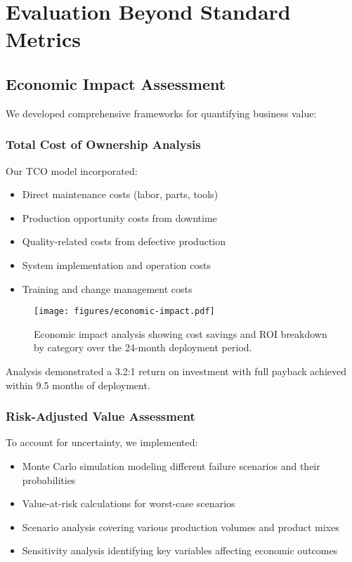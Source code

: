 \section{Evaluation Beyond Standard Metrics}
\subsection{Economic Impact Assessment}
We developed comprehensive frameworks for quantifying business value:

\subsubsection{Total Cost of Ownership Analysis}
Our TCO model incorporated:
\begin{itemize}
    \item Direct maintenance costs (labor, parts, tools)
    \item Production opportunity costs from downtime
    \item Quality-related costs from defective production
    \item System implementation and operation costs
    \item Training and change management costs
\end{itemize}

\begin{figure}[t]
\centering
\texttt{[image: figures/economic-impact.pdf]}
\caption{Economic impact analysis showing cost savings and ROI breakdown by category over the 24-month deployment period.}
\label{fig:economic_impact}
\end{figure}

Analysis demonstrated a 3.2:1 return on investment with full payback achieved within 9.5 months of deployment.

\subsubsection{Risk-Adjusted Value Assessment}
To account for uncertainty, we implemented:
\begin{itemize}
    \item Monte Carlo simulation modeling different failure scenarios and their probabilities
    \item Value-at-risk calculations for worst-case scenarios
    \item Scenario analysis covering various production volumes and product mixes
    \item Sensitivity analysis identifying key variables affecting economic outcomes
\end{itemize}

